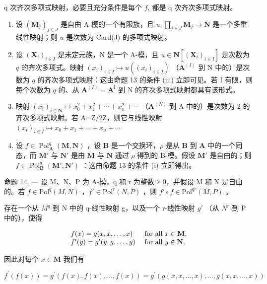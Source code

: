 q 次齐次多项式映射，必要且充分条件是每个 \(f_{i}\) 都是 q 次齐次多项式映射。

\begin{enumerate}
\def\labelenumi{\arabic{enumi})}
\setcounter{enumi}{2}
\item
  设 \((\mathbf{M}_j)_{j\in J}\) 是自由 A-模的一个有限族，且 \(u:\prod_{j\in J}\mathbf{M}_j\to \mathbf{N}\) 是一个多重线性映射；则 \(u\) 是次数为 Card(J) 的多项式映射。
\item
  设 \((\mathbf{X}_i)_{i\in I}\) 是未定元族，N 是一个 A-模，且 \(u\in \mathbf{N}[(\mathbf{X}_i)_{i\in I}]\) 是次数为 \(q\) 的齐次多项式。映射 \((x_{i})_{i\in I}\mapsto u((x_{i})_{i\in I})\) （\(\mathbf{A}^{(I)}\) 到 N 中的）是次数为 \(q\) 的齐次多项式映射：这由命题 13 的条件 (iii) 立即可见。若 I 有限，则每个次数为 \(q\) 的、从 \(\mathbf{A}^{(I)} = \mathbf{A}^{\mathrm{I}}\) 到 N 的齐次多项式映射都具有该形式。
\item
  映射 \((x_{i})_{i\in\mathbf{N}}\mapsto x_{0}^{2}+x_{1}^{2}+\cdots+x_{n}^{2}+\cdots\) （\(\mathbf{A}^{(N)}\) 到 A 中的）是次数为 2 的齐次多项式映射。若 A=Z/2Z，则它与线性映射 \((x_{i})_{i\in I}\mapsto x_{0}+x_{1}+\cdots+x_{n}+\cdots\)
\item
  设 \(f \in \operatorname{Pol}_{\mathbf{A}}^{q}(\mathbf{M}, \mathbf{N})\) ，设 \(\mathbf{B}\) 是一个交换环，\(\rho\) 是从 \(\mathbf{B}\) 到 \(\mathbf{A}\) 中的一个同态，而 \(\mathbf{M}'\) 与 \(\mathbf{N}'\) 是由 \(\mathbf{M}\) 与 \(\mathbf{N}\) 通过 \(\rho\) 得到的 B-模。假设 \(\mathbf{M}'\) 是自由的；则 \(f \in \operatorname{Pol}_{\mathbf{B}}^{q}(\mathbf{M}', \mathbf{N}')\) ：这由命题 13 的条件 (i) 立即得出。
\end{enumerate}

命题 14. --- 设 M、N、P 为 A-模，q 和 r 为整数 ≥ 0，并假设 M 和 N 是自由的。若 \(f \in \text{Pol}^{q}(M, N)\) ，\(f' \in \text{Pol}^{r}(N, P)\) ，则 \(f' \circ f \in \text{Pol}^{qr}(M, P)\) 。

存在一个从 \(M^{q}\) 到 N 中的 q-线性映射 g，以及一个 r-线性映射 \(g'\) （从 \(N^{r}\) 到 P 中的），使得

\[
\begin{array}{l l} f (x) = g (x, x, \dots , x) & \text { for   all } x \in \mathbf {M}, \\ f ^ {\prime} (y) = g ^ {\prime} (y, y, \dots , y) & \text { for   all } y \in \mathbf {N}. \end{array}
\]

因此对每个 \(x \in \mathbf{M}\) 我们有

\[
f ^ {\prime} (f (x)) = g ^ {\prime} (f (x), f (x), \dots , f (x)) = g ^ {\prime} (g (x, x, \dots , x), \dots , g (x, x, \dots , x))
\]

